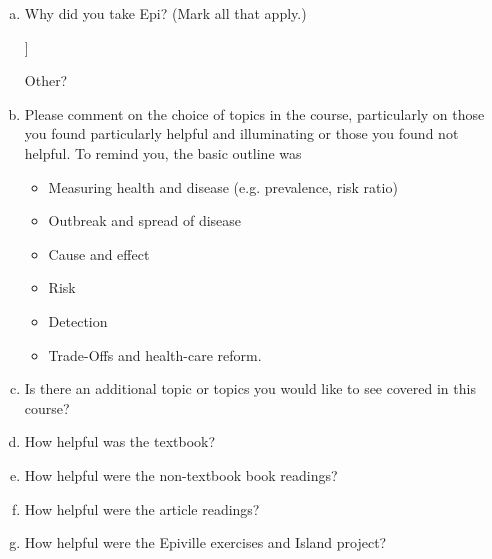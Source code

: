 \begin{enumerate}[(a)]
\item Why did you take Epi? (Mark all that apply.)
\begin{MultipleChoice}
\end{MultipleChoice}]

Other? \TextEntry

\vspace*{.5in}

\item Please comment on the choice of topics in the course, particularly on those you found particularly helpful and illuminating or those you found not helpful.  To remind you, the basic outline was
\begin{itemize}
\item Measuring health and disease (e.g. prevalence, risk ratio)
\item Outbreak and spread of disease
\item Cause and effect
\item Risk
\item Detection
\item Trade-Offs and health-care reform.
\end{itemize}

\vspace*{2in}

\item Is there an additional topic or topics you would like to see covered in this course?

\vspace*{1in}

\item How helpful was the textbook?

\vspace*{1in}

\item How helpful were the non-textbook book readings?

\vspace{1in}

\item How helpful were the article readings?

\vspace*{1in}

\item How helpful were the Epiville exercises and Island project?


\end{enumerate}
